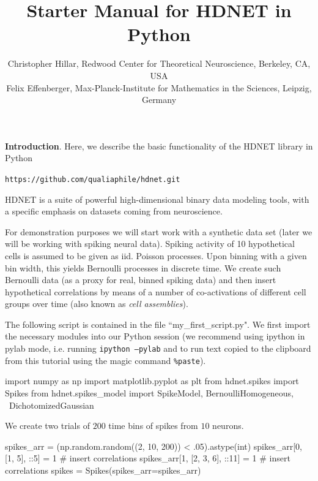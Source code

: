 \documentclass[letter, 12pt]{article}
\theoremstyle{definition}
\theoremstyle{remark}
\begin{document}
\title{Starter Manual for HDNET in Python}
\author{\normalsize Christopher Hillar, Redwood Center for Theoretical Neuroscience, Berkeley, CA, USA\\
\normalsize Felix Effenberger, Max-Planck-Institute for Mathematics in the Sciences, Leipzig, Germany
}
\date{}



\maketitle

\textbf{Introduction}.  Here, we describe the basic functionality of the HDNET library in Python

\begin{center}
\texttt{https://github.com/qualiaphile/hdnet.git} \\
\end{center}

HDNET is a suite of powerful high-dimensional binary data modeling tools, with a specific emphasis on datasets coming from neuroscience.

For demonstration purposes we will start work with a synthetic data set  (later we will be working with spiking neural data). Spiking activity of 10 hypothetical cells is assumed to be given as iid. Poisson processes. Upon binning with a given bin width, this yields Bernoulli processes in discrete time. We create such Bernoulli data (as a proxy for real, binned spiking data) and then insert hypothetical correlations by means of a number of co-activations of different cell groups over time (also known as \textit{cell assemblies}).

The following script is contained in the file ``my\_first\_script.py".  We first import the necessary modules into our Python session (we recommend using ipython in pylab mode, i.e. running \texttt{ipython --pylab} and to run text copied to the clipboard from this tutorial using the magic command \texttt{\%paste}).

\begin{python}
import numpy as np
import matplotlib.pyplot as plt
from hdnet.spikes import Spikes
from hdnet.spikes_model import SpikeModel, BernoulliHomogeneous, \
	DichotomizedGaussian
\end{python}

We create two trials of $200$ time bins of spikes from $10$ neurons.

\begin{python}
spikes_arr = (np.random.random((2, 10, 200)) < .05).astype(int)
spikes_arr[0, [1, 5], ::5] = 1 # insert correlations
spikes_arr[1, [2, 3, 6], ::11] = 1  # insert correlations
spikes = Spikes(spikes_arr=spikes_arr)
\end{python}
\end{document}
